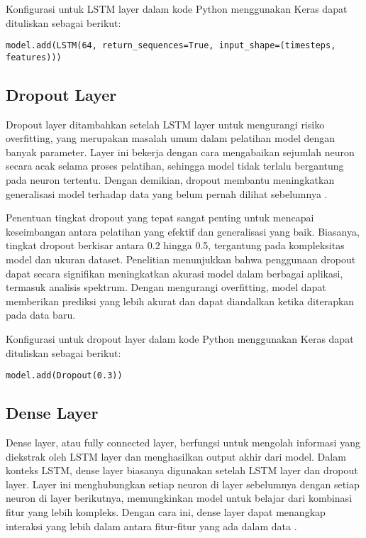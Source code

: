 \par Konfigurasi untuk LSTM layer dalam kode Python menggunakan Keras dapat dituliskan sebagai berikut:

\lstinline[]|model.add(LSTM(64, return_sequences=True, input_shape=(timesteps, features)))|

\subsection{Dropout Layer}
\par Dropout layer ditambahkan setelah LSTM layer untuk mengurangi risiko overfitting, yang merupakan masalah umum dalam pelatihan model dengan banyak parameter. Layer ini bekerja dengan cara mengabaikan sejumlah neuron secara acak selama proses pelatihan, sehingga model tidak terlalu bergantung pada neuron tertentu. Dengan demikian, dropout membantu meningkatkan generalisasi model terhadap data yang belum pernah dilihat sebelumnya \cite{bengio2012}.

\par Penentuan tingkat dropout yang tepat sangat penting untuk mencapai keseimbangan antara pelatihan yang efektif dan generalisasi yang baik. Biasanya, tingkat dropout berkisar antara 0.2 hingga 0.5, tergantung pada kompleksitas model dan ukuran dataset. Penelitian menunjukkan bahwa penggunaan dropout dapat secara signifikan meningkatkan akurasi model dalam berbagai aplikasi, termasuk analisis spektrum. Dengan mengurangi overfitting, model dapat memberikan prediksi yang lebih akurat dan dapat diandalkan ketika diterapkan pada data baru.

\par Konfigurasi untuk dropout layer dalam kode Python menggunakan Keras dapat dituliskan sebagai berikut:
    
\lstinline[]|model.add(Dropout(0.3))|
  

\subsection{Dense Layer}
\par Dense layer, atau fully connected layer, berfungsi untuk mengolah informasi yang diekstrak oleh LSTM layer dan menghasilkan output akhir dari model. Dalam konteks LSTM, dense layer biasanya digunakan setelah LSTM layer dan dropout layer. Layer ini menghubungkan setiap neuron di layer sebelumnya dengan setiap neuron di layer berikutnya, memungkinkan model untuk belajar dari kombinasi fitur yang lebih kompleks. Dengan cara ini, dense layer dapat menangkap interaksi yang lebih dalam antara fitur-fitur yang ada dalam data \cite{zhang2019}.

